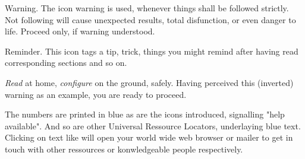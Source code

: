 \warning Warning. The icon warning is used, whenever things shall be followed 
strictly.  Not following will cause unexpected results, total disfunction, or 
even danger to life. Proceed only, if warning understood.

  

\tip Reminder. This icon tags a tip, trick, things you might remind after having read corresponding sections and so on.



\emph{Read} at home, \emph{configure} on the ground, safely. Having perceived 
this (inverted) warning as an example, you are ready to proceed.


The numbers are printed in blue as are the icons introduced, signalling "help 
available". And so are other Universal Ressource Locators, underlaying blue 
text. Clicking on text like  will open your world wide 
web browser or mailer to get in touch with other ressources or konwledgeable 
people respectively.

